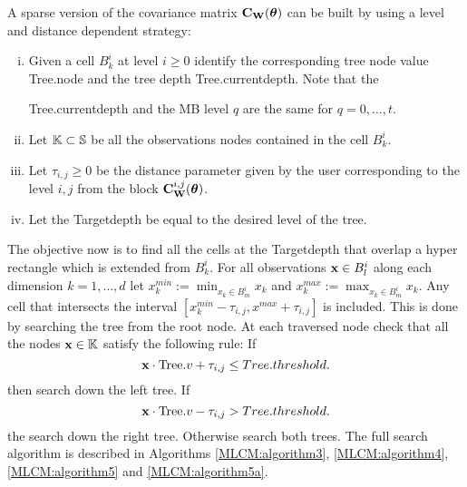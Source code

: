 \documentclass[11pt,final]{amsart}       %
\begin{document}
A sparse version of the covariance matrix $\mathbf{C}_{\mathbf{W}}(\boldsymbol{\theta})$ can be
built by using a level and distance dependent strategy:

\begin{enumerate}[i)]

\item Given a cell $B^{i}_{k}$ at level $i \geq 0$ identify the
  corresponding tree node value Tree.node and the tree depth
  Tree.currentdepth. Note that the

  Tree.currentdepth and the MB level
  $q$ are the same for $q = 0,\dots,t$.

\item Let $\mathbb{K} \subset \mathbb{S}$ be all the observations nodes contained
  in the cell $B^{i}_{k}$.

\item Let $\tau_{i,j} \geq 0$ be the distance parameter given by the
  user corresponding to the level $i,j$ from the block
  $\mathbf{C}^{i,j}_{\mathbf{W}}(\boldsymbol{\theta})$.

\item Let the Targetdepth be equal to the desired level of the tree.

\end{enumerate}
    The objective now is to find all the cells at the Targetdepth that
    overlap a hyper rectangle which is extended from $B^{i}_{k}$.  For
    all observations $\mathbf{x} \in B^{i}_{l}$ along each dimension $k = 1,
    \dots, d$ let $x^{min}_k := \min_{ x_k \in B^i_m} x_k$ and
    $x^{max}_k := \max_{ x_k \in B^i_m} x_k$.  Any cell that
    intersects the interval $[x^{min}_{k} - \tau_{i,j} ,x^{max} +
      \tau_{i,j}]$ is included. This is done by searching the tree
    from the root node. At each traversed node check that all the
    nodes $\mathbf{x} \in \mathbb{K}$ satisfy the following rule: If
\[
\mathbf{x} \cdot \mbox{Tree}.v + \tau_{i,j} \leq Tree.threshold.
\]
then search down the left tree. If 
\[
\mathbf{x} \cdot \mbox{Tree}.v - \tau_{i,j} > Tree.threshold.
\]
the search down the right tree. Otherwise search both trees.
The full search algorithm is described in Algorithms
\ref{MLCM:algorithm3}, \ref{MLCM:algorithm4}, \ref{MLCM:algorithm5}
and \ref{MLCM:algorithm5a}.
\end{document}
